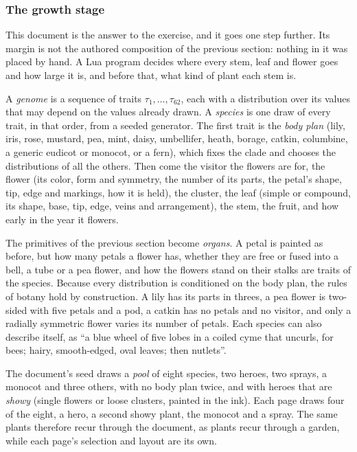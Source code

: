 \subsubsection{The growth stage}

This document is the answer to the exercise, and it goes one step further. Its margin is not
the authored composition of the previous section: nothing in it was placed by hand. A Lua
program decides where every stem, leaf and flower goes and how large it is, and before that,
what kind of plant each stem is.

\begin{definition}
A \emph{genome} is a sequence of traits $\tau_1,\dots,\tau_{62}$, each with a distribution over
its values that may depend on the values already drawn. A \emph{species} is one draw of every
trait, in that order, from a seeded generator. The first trait is the \emph{body plan} (lily,
iris, rose, mustard, pea, mint, daisy, umbellifer, heath, borage, catkin, columbine, a generic
eudicot or monocot, or a fern), which fixes the clade and chooses the distributions of all the
others. Then come the visitor the flowers are for, the flower (its color, form and symmetry,
the number of its parts, the petal's shape, tip, edge and markings, how it is held), the
cluster, the leaf (simple or compound, its shape, base, tip, edge, veins and arrangement), the
stem, the fruit, and how early in the year it flowers.
\end{definition}

The primitives of the previous section become \emph{organs}. A petal is painted as before, but
how many petals a flower has, whether they are free or fused into a bell, a tube or a pea
flower, and how the flowers stand on their stalks are traits of the species. Because every
distribution is conditioned on the body plan, the rules of botany hold by construction. A lily
has its parts in threes, a pea flower is two-sided with five petals and a pod, a catkin has no
petals and no visitor, and only a radially symmetric flower varies its number of petals. Each
species can also describe itself, as ``a blue wheel of five lobes in a coiled cyme that
uncurls, for bees; hairy, smooth-edged, oval leaves; then nutlets''.

\begin{construction}[Community]
The document's seed draws a \emph{pool} of eight species, two heroes, two sprays, a monocot
and three others, with no body plan twice, and with heroes that are \emph{showy} (single
flowers or loose clusters, painted in the ink). Each page draws four of the eight, a hero, a
second showy plant, the monocot and a spray. The same plants therefore recur through the
document, as plants recur through a garden, while each page's selection and layout are its
own.
\end{construction}

